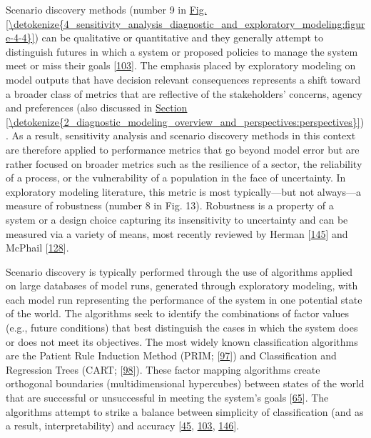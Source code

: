\documentclass[letterpaper,10pt,english]{sphinxmanual}
\begin{document}
\sphinxAtStartPar
Scenario discovery methods (number 9 in \hyperref[\detokenize{4_sensitivity_analysis_diagnostic_and_exploratory_modeling:figure-4-4}]{Fig.\@ \ref{\detokenize{4_sensitivity_analysis_diagnostic_and_exploratory_modeling:figure-4-4}}}) can be qualitative or quantitative and they generally attempt to distinguish futures in which a system or proposed policies to manage the system meet or miss their goals {[}\hyperlink{cite.index:id70}{103}{]}. The emphasis placed by exploratory modeling on model outputs that have decision relevant consequences represents a shift toward a broader class of metrics that are reflective of the stakeholders’ concerns, agency and preferences (also discussed in \hyperref[\detokenize{2_diagnostic_modeling_overview_and_perspectives:perspectives}]{Section \ref{\detokenize{2_diagnostic_modeling_overview_and_perspectives:perspectives}}}). As a result, sensitivity analysis and scenario discovery methods in this context are therefore applied to performance metrics that go beyond model error but are rather focused on broader metrics such as the resilience of a sector, the reliability of a process, or the vulnerability of a population in the face of uncertainty. In exploratory modeling literature, this metric is most typically—but not always—a measure of robustness (number 8 in Fig. 13). Robustness is a property of a system or a design choice capturing its insensitivity to uncertainty and can be measured via a variety of means, most recently reviewed by Herman  {[}\hyperlink{cite.index:id78}{145}{]} and McPhail  {[}\hyperlink{cite.index:id55}{128}{]}.

\sphinxAtStartPar
Scenario discovery is typically performed through the use of algorithms applied on large databases of model runs, generated through exploratory modeling, with each model run representing the performance of the system in one potential state of the world. The algorithms seek to identify the combinations of factor values (e.g., future conditions) that best distinguish the cases in which the system does or does not meet its objectives. The most widely known classification algorithms are the Patient Rule Induction Method (PRIM; {[}\hyperlink{cite.index:id79}{97}{]}) and Classification and Regression Trees (CART; {[}\hyperlink{cite.index:id80}{98}{]}). These factor mapping algorithms create orthogonal boundaries (multi\sphinxhyphen{}dimensional hypercubes) between states of the world that are successful or unsuccessful in meeting the system’s goals {[}\hyperlink{cite.index:id81}{65}{]}. The algorithms attempt to strike a balance between simplicity of classification (and as a result, interpretability) and accuracy {[}\hyperlink{cite.index:id16}{45}, \hyperlink{cite.index:id70}{103}, \hyperlink{cite.index:id82}{146}{]}.
\end{document}
